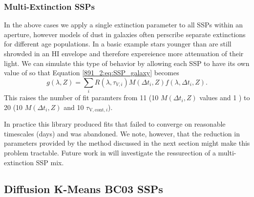 

\subsubsection{Multi-Extinction SSPs}

In the above cases we apply a single extinction parameter to all SSPs
within an aperture, however models of dust in galaxies
\citep{Charlot00} often perscribe separate extinctions for different
age populations. In a basic example \citep{Charlot00} stars younger
than  are still shrowded in an HI envelope and therefore
expereience more attenuation of their light. We can simulate this type
of behavior by allowing each SSP to have its own value of \tauV so
that Equation \ref{891_2:eq:SSP_galaxy} becomes
\begin{equation}
g(\lambda,Z) = \sum_{i} R(\lambda,\tau_{V,i}) M(\Delta t_i,Z)
f(\lambda,\Delta t_i, Z).
\end{equation}
This raises the number of fit paramters from 11 (10 $M(\Delta t_i, Z)$
values and 1 \tauV) to 20 (10 $M(\Delta t_i, Z)$ and 10
$\tau_{\mathrm{V,cont},i}$).

In practice this library produced fits that failed to converge on
reasonable timescales (days) and was abandoned. We note, however, that
the reduction in parameters provided by the method discussed in the
next section might make this problem tractable. Future work in will
investigate the ressurection of a multi-extinction SSP mix.

\subsection{Diffusion K-Means BC03 SSPs}
\label{891_2:sec:bc03_dfk}

